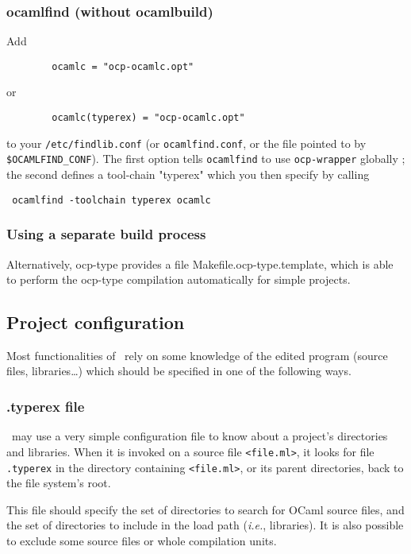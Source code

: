 \subsubsection{ocamlfind (without ocamlbuild)}
Add
{\verbsize \begin{verbatim}
        ocamlc = "ocp-ocamlc.opt"
\end{verbatim}}
\noindent or
{\verbsize \begin{verbatim}
        ocamlc(typerex) = "ocp-ocamlc.opt"
\end{verbatim}}
\noindent to your \verb!/etc/findlib.conf! (or \verb!ocamlfind.conf!,
or the file pointed to by \verb!$OCAMLFIND_CONF!).  The first
option tells \verb!ocamlfind! to use \verb!ocp-wrapper! globally ; the
second defines a tool-chain "typerex" which you then specify by calling
{\verbsize \begin{verbatim} ocamlfind -toolchain typerex ocamlc
\end{verbatim}}

\subsubsection{Using a separate build process}
Alternatively, ocp-type provides a file Makefile.ocp-type.template,
which is able to perform the ocp-type compilation automatically for
simple projects.

\subsection{Project configuration}

Most functionalities of \typerex\ rely on some knowledge of the
edited program (source files, libraries\ldots) which should be
specified in one of the following ways.

\subsubsection{.typerex file}
\typerex\ may use a very simple configuration file to know about a
project's directories and libraries. When it is invoked on a source file
\verb!<file.ml>!, it looks for file \verb!.typerex! in the directory containing
\verb!<file.ml>!, or its parent directories, back to the file system's root.

This file should specify the set of directories to search for OCaml
source files, and the set of directories to include in the load path
(\emph{i.e.}, libraries). It is also possible to exclude some source
files or whole compilation units.

